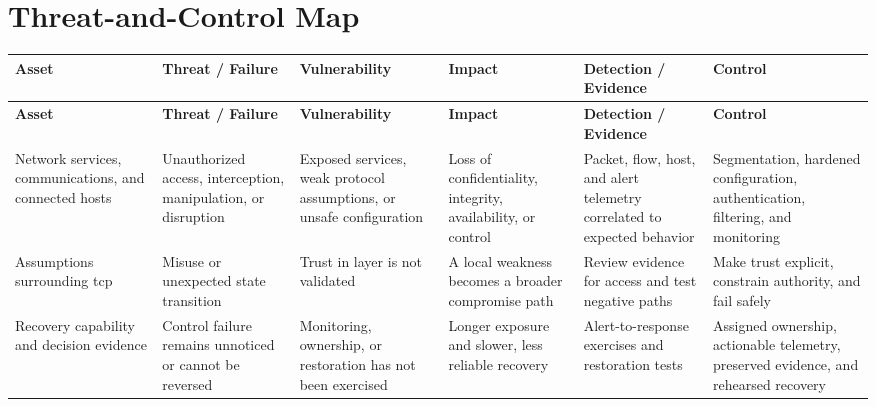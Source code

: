 \documentclass[11pt]{article}
\begin{document}
\section*{Threat-and-Control Map}
\begingroup\scriptsize\setlength{\tabcolsep}{2pt}
\begin{longtable}{>{\RaggedRight\arraybackslash}p{}>{\RaggedRight\arraybackslash}p{}>{\RaggedRight\arraybackslash}p{}>{\RaggedRight\arraybackslash}p{}>{\RaggedRight\arraybackslash}p{}>{\RaggedRight\arraybackslash}p{}}
\toprule\rowcolor{Navy}\color{white}\textbf{Asset} & \color{white}\textbf{Threat / Failure} & \color{white}\textbf{Vulnerability} & \color{white}\textbf{Impact} & \color{white}\textbf{Detection / Evidence} & \color{white}\textbf{Control}\\\midrule
\endfirsthead
\toprule\rowcolor{Navy}\color{white}\textbf{Asset} & \color{white}\textbf{Threat / Failure} & \color{white}\textbf{Vulnerability} & \color{white}\textbf{Impact} & \color{white}\textbf{Detection / Evidence} & \color{white}\textbf{Control}\\\midrule
\endhead
Network services, communications, and connected hosts & Unauthorized access, interception, manipulation, or disruption & Exposed services, weak protocol assumptions, or unsafe configuration & Loss of confidentiality, integrity, availability, or control & Packet, flow, host, and alert telemetry correlated to expected behavior & Segmentation, hardened configuration, authentication, filtering, and monitoring\\\midrule
Assumptions surrounding tcp & Misuse or unexpected state transition & Trust in layer is not validated & A local weakness becomes a broader compromise path & Review evidence for access and test negative paths & Make trust explicit, constrain authority, and fail safely\\\midrule
Recovery capability and decision evidence & Control failure remains unnoticed or cannot be reversed & Monitoring, ownership, or restoration has not been exercised & Longer exposure and slower, less reliable recovery & Alert-to-response exercises and restoration tests & Assigned ownership, actionable telemetry, preserved evidence, and rehearsed recovery\\\midrule
\bottomrule
\end{longtable}
\endgroup
\end{document}

